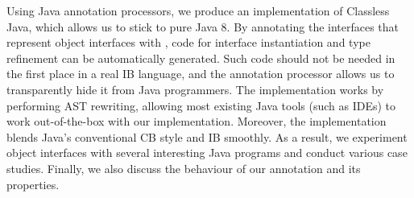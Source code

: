 






Using Java annotation processors, we produce an implementation of
Classless Java, which allows us to stick to pure Java 8. By annotating
 the interfaces that represent object interfaces with \mixin, code for interface instantiation and
type refinement can be automatically generated. Such code should not be needed in the first place in
a real IB language, and the annotation processor allows us to
transparently hide it from Java programmers. The implementation works
by performing AST rewriting, allowing most existing Java tools (such as
IDEs) to work out-of-the-box with our implementation. Moreover, the
implementation blends Java's conventional CB style and IB smoothly.
As a result, we experiment object interfaces with several interesting
Java programs and conduct various case studies.  Finally, we also
discuss the behaviour of our \mixin annotation and 
its properties.



%



